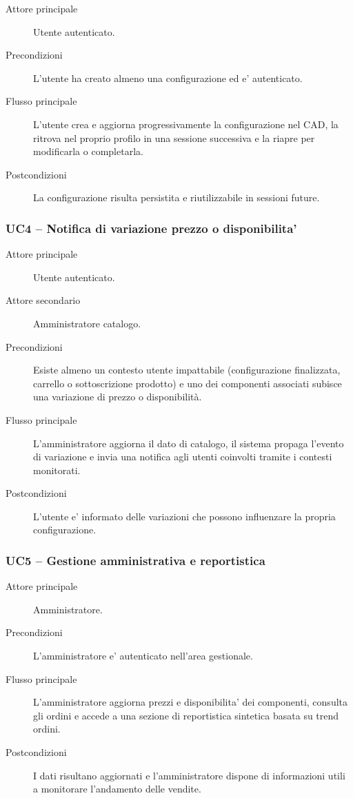 \begin{description}
	\item[Attore principale] Utente autenticato.
	\item[Precondizioni] L'utente ha creato almeno una configurazione ed e' autenticato.
	\item[Flusso principale] L'utente crea e aggiorna progressivamente la configurazione nel CAD, la ritrova nel proprio profilo in una sessione successiva e la riapre per modificarla o completarla.
	\item[Postcondizioni] La configurazione risulta persistita e riutilizzabile in sessioni future.
\end{description}

\subsubsection{UC4 -- Notifica di variazione prezzo o disponibilita'}

\begin{description}
	\item[Attore principale] Utente autenticato.
	\item[Attore secondario] Amministratore catalogo.
	\item[Precondizioni] Esiste almeno un contesto utente impattabile (configurazione finalizzata, carrello o sottoscrizione prodotto) e uno dei componenti associati subisce una variazione di prezzo o disponibilità.
	\item[Flusso principale] L'amministratore aggiorna il dato di catalogo, il sistema propaga l'evento di variazione e invia una notifica agli utenti coinvolti tramite i contesti monitorati.
	\item[Postcondizioni] L'utente e' informato delle variazioni che possono influenzare la propria configurazione.
\end{description}

\subsubsection{UC5 -- Gestione amministrativa e reportistica}

\begin{description}
	\item[Attore principale] Amministratore.
	\item[Precondizioni] L'amministratore e' autenticato nell'area gestionale.
	\item[Flusso principale] L'amministratore aggiorna prezzi e disponibilita' dei componenti, consulta gli ordini e accede a una sezione di reportistica sintetica basata su trend ordini.
	\item[Postcondizioni] I dati risultano aggiornati e l'amministratore dispone di informazioni utili a monitorare l'andamento delle vendite.
\end{description}

